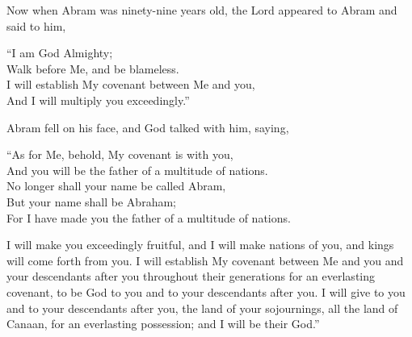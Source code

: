     \vspace{1\baselineskip}

\begin{scripture}[Genesis 17:1-8]
    Now when Abram was ninety-nine years old, 
     the Lord appeared to Abram and said to him,
    \vspace{1\baselineskip}

    “I am God Almighty;\\
    Walk before Me, and be blameless.\\
    I will establish My covenant between Me and you,\\
    And I will multiply you exceedingly.”\\

    \vspace{1\baselineskip}

    \noindent{}Abram fell on his face, and God talked with him, saying,

    \vspace{1\baselineskip}

    “As for Me, behold, My covenant is with you,\\
    And you will be the father of a multitude of nations.\\
    No longer shall your name be called Abram,\\
    But your name shall be Abraham;\\
    For I have made you the father of a multitude of nations.\\

    \vspace{1\baselineskip}

    I will make you exceedingly fruitful, and I will make nations of you, and kings will come forth from you.
    I will establish My covenant between Me and you and your descendants after you throughout their generations for an everlasting covenant, to be God to you and to your descendants after you.
    I will give to you and to your descendants after you, the land of your sojournings, all the land of Canaan, for an everlasting possession; and I will be their God.”\\
\end{scripture}

\pagebreak


